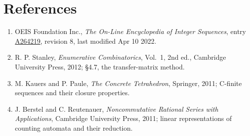\documentclass[11pt]{article}
\theoremstyle{definition}
\begin{document}
\section{References}

\begin{enumerate}

\item OEIS Foundation Inc., \emph{The On-Line Encyclopedia of Integer Sequences}, entry \href{https://oeis.org/A264219}{A264219}, revision 8, last modified Apr 10 2022.

\item R. P. Stanley, \emph{Enumerative Combinatorics}, Vol.~1, 2nd ed., Cambridge University Press, 2012; \S4.7, the transfer-matrix method.

\item M. Kauers and P. Paule, \emph{The Concrete Tetrahedron}, Springer, 2011; C-finite sequences and their closure properties.

\item J. Berstel and C. Reutenauer, \emph{Noncommutative Rational Series with Applications}, Cambridge University Press, 2011; linear representations of counting automata and their reduction.

\end{enumerate}
\end{document}
